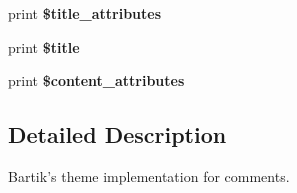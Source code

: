 \begin{DoxyCompactItemize}
\item 
\hypertarget{themes_2bartik_2templates_2comment_8tpl_8php_a938746e3da4238c45247505b2d7bd89f}{
print {\bfseries \$title\_\-attributes}}
\label{themes_2bartik_2templates_2comment_8tpl_8php_a938746e3da4238c45247505b2d7bd89f}

\item 
\hypertarget{themes_2bartik_2templates_2comment_8tpl_8php_aec2795512d255332f57cacd930a090b4}{
print {\bfseries \$title}}
\label{themes_2bartik_2templates_2comment_8tpl_8php_aec2795512d255332f57cacd930a090b4}

\item 
\hypertarget{themes_2bartik_2templates_2comment_8tpl_8php_ae2ee2e16f11937564281332a76a658e8}{
print {\bfseries \$content\_\-attributes}}
\label{themes_2bartik_2templates_2comment_8tpl_8php_ae2ee2e16f11937564281332a76a658e8}

\end{DoxyCompactItemize}


\subsection{Detailed Description}
Bartik's theme implementation for comments.

